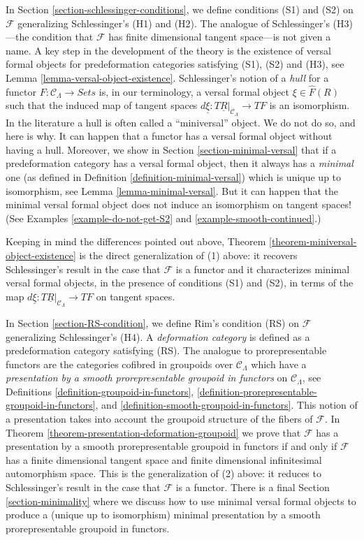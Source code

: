 \medskip\noindent
In
Section \ref{section-schlessinger-conditions},
we define conditions (S1) and (S2) on $\mathcal{F}$ generalizing
Schlessinger's (H1) and (H2). The analogue of Schlessinger's
(H3)---the condition that $\mathcal{F}$ has finite dimensional
tangent space---is not given a name.
A key step in the development of the theory is the existence of
versal formal objects for predeformation categories satisfying
(S1), (S2) and (H3), see
Lemma \ref{lemma-versal-object-existence}.
Schlessinger's notion of a {\it hull} for a functor
$F : \mathcal{C}_\Lambda \to \textit{Sets}$
is, in our terminology, a versal formal object $\xi \in \widehat{F}(R)$
such that the induced map of tangent spaces
$d\underline{\xi} : T\underline{R}|_{\mathcal{C}_\Lambda} \to TF$
is an isomorphism.
In the literature a hull is often called a ``miniversal'' object.
We do not do so, and here is why. It can happen that a functor has a
versal formal object without having a hull. Moreover, we show in
Section \ref{section-minimal-versal}
that if a predeformation category has a versal formal object, then
it always has a {\it minimal} one (as defined in
Definition \ref{definition-minimal-versal})
which is unique up to isomorphism, see
Lemma \ref{lemma-minimal-versal}.
But it can happen that the minimal versal formal object does not
induce an isomorphism on tangent spaces! (See
Examples \ref{example-do-not-get-S2} and
\ref{example-smooth-continued}.)

\medskip\noindent
Keeping in mind the differences pointed out above,
Theorem \ref{theorem-miniversal-object-existence}
is the direct generalization of (1) above: it recovers Schlessinger's
result in the case that $\mathcal{F}$ is a functor and it characterizes
minimal versal formal objects, in the presence of conditions
(S1) and (S2), in terms of the map
$d\underline{\xi} : T\underline{R}|_{\mathcal{C}_\Lambda} \to TF$
on tangent spaces.

\medskip\noindent
In Section \ref{section-RS-condition},
we define Rim's condition (RS) on $\mathcal{F}$ generalizing
Schlessinger's (H4). A {\it deformation category} is defined as a
predeformation category satisfying (RS).
The analogue to prorepresentable functors are the categories
cofibred in groupoids over $\mathcal{C}_\Lambda$ which have
a {\it presentation by a smooth prorepresentable groupoid in functors}
on $\mathcal{C}_\Lambda$, see
Definitions \ref{definition-groupoid-in-functors},
\ref{definition-prorepresentable-groupoid-in-functors}, and
\ref{definition-smooth-groupoid-in-functors}.
This notion of a presentation takes into account the groupoid structure
of the fibers of $\mathcal{F}$. In
Theorem \ref{theorem-presentation-deformation-groupoid}
we prove that $\mathcal{F}$ has a presentation by a smooth prorepresentable
groupoid in functors if and only if $\mathcal{F}$ has a finite dimensional
tangent space and finite dimensional infinitesimal automorphism space.
This is the generalization of (2) above: it reduces to Schlessinger's result
in the case that $\mathcal{F}$ is a functor.
There is a final
Section \ref{section-minimality}
where we discuss how to use minimal versal formal objects
to produce a (unique up to isomorphism) minimal presentation
by a smooth prorepresentable groupoid in functors.

